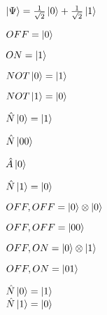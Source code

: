 \documentclass[multi=math, crop, convert]{standalone}
\begin{document}
 

\begin{math}
    \ket{\Psi} = \frac{1}{\sqrt{2}} \ket{0} + \frac{1}{\sqrt{2}} \ket{1}
\end{math}

\begin{math}
OFF = \ket{0}
\end{math}

\begin{math}
ON = \ket{1}
\end{math}

\begin{math}
NOT\ket{0} = \ket{1}
\end{math}

\begin{math}
NOT\ket{1} = \ket{0}
\end{math}

\begin{math}
\hat{N}\ket{0} = \ket{1}
\end{math}

\begin{math}
	\hat{N}\ket{00}
\end{math}

\begin{math}
	\hat{A}\ket{0}
\end{math}

\begin{math}
\hat{N}\ket{1} = \ket{0}
\end{math}

\begin{math}
OFF, OFF = \ket{0} \otimes \ket{0}
\end{math}

\begin{math}
OFF, OFF = \ket{00}
\end{math}

\begin{math}
OFF, ON = \ket{0} \otimes \ket{1}
\end{math}

\begin{math}
OFF, ON = \ket{01}
\end{math}

\begin{math}
	\begin{matrix}
		\hat{N}\ket{0} = \ket{1}\\
		\hat{N}\ket{1} = \ket{0}
	\end{matrix}
\end{math}
\end{document}
